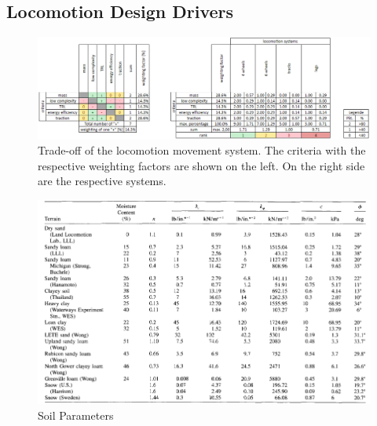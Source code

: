 \subsection{Locomotion Design Drivers}
\label{app:DesignDrivers}



\begin{figure}[htb] 
  \centering
     \includegraphics[width=1\textwidth]{Media/LocomotionTradeOff.png}
  \caption{Trade-off of the locomotion movement system. The criteria with the respective weighting factors are shown on the left. On the right side are the respective systems.}
  \label{fig:TradeOffLoco}
\end{figure}


\begin{figure}[htb] 
  \centering
     \includegraphics[width=1\textwidth]{Media/SoilParameters.png}
  \caption{Soil Parameters}
  \label{fig:SoilParameters}
\end{figure}


